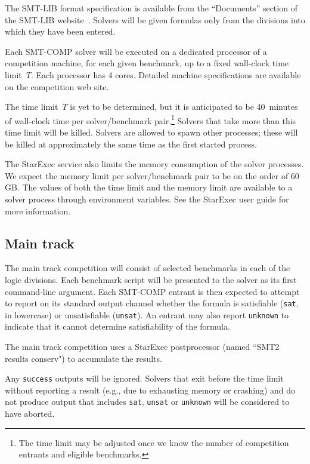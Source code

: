 \documentclass[12pt]{article}
\begin{document}
%
The SMT-LIB format specification is available from the ``Documents''
section of the SMT-LIB website~\cite{SMT-LIB}.  Solvers will be given
formulas only from the divisions into which they have been entered.

%
Each SMT-COMP solver will be executed on a dedicated processor of a
competition machine, for each given benchmark, up to a fixed
wall-clock time limit~$T$.  Each processor has 4 cores.  Detailed
machine specifications are available on the competition web site.

The time limit~$T$ is yet to be determined, but it is anticipated to
be 40~minutes of wall-clock time per solver/benchmark
pair.\footnote{The time limit may be adjusted once we know the number
  of competition entrants and eligible benchmarks.}  Solvers that take
more than this time limit will be killed.  Solvers are allowed to
spawn other processes; these will be killed at approximately the same
time as the first started process.

The StarExec service also limits the memory consumption of the solver
processes.  We expect the memory limit per solver/benchmark pair to be
on the order of 60\,GB.  The values of both the time limit and the
memory limit are available to a solver process through environment
variables.  See the StarExec user guide for more information.

\subsection{Main track}
\label{sec:exec:main}

The main track competition will consist of selected benchmarks in each
of the logic divisions.  Each benchmark script will be presented to
the solver as its first command-line argument.  Each SMT-COMP entrant
is then expected to attempt to report on its standard output channel
whether the formula is satisfiable (\texttt{sat}, in lowercase) or
unsatisfiable (\texttt{unsat}).  An entrant may also report
\texttt{unknown} to indicate that it cannot determine satisfiability
of the formula.

The main track competition uses a StarExec postprocessor (named ``SMT2
results conserv") to accumulate the results.

%
Any \texttt{success} outputs will be ignored.  Solvers that exit
before the time limit without reporting a result (e.g., due to
exhausting memory or crashing) and do not produce output that includes
\texttt{sat}, \texttt{unsat} or \texttt{unknown} will be considered to
have aborted.
\end{document}
